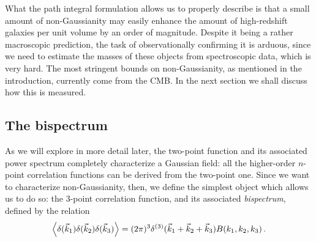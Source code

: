 \documentclass[main.tex]{subfiles}
\begin{document}
What the path integral formulation allows us to properly describe is that a small amount of non-Gaussianity may easily enhance the amount of high-redshift galaxies per unit volume by an order of magnitude.
Despite it being a rather macroscopic prediction, the task of observationally confirming it is arduous, since we need to estimate the masses of these objects from spectroscopic data, which is very hard. 
The most stringent bounds on non-Gaussianity, as mentioned in the introduction, currently come from the CMB. In the next section we shall discuss how this is measured. 





\subsection{The bispectrum}

As we will explore in more detail later, the two-point function and its associated power spectrum completely characterize a Gaussian field: all the higher-order \(n\)-point correlation functions can be derived from the two-point one.
Since we want to characterize non-Gaussianity, then, we define the simplest object which allows us to do so: the 3-point correlation function, and its associated \emph{bispectrum}, defined by the relation 
%
\begin{align}
\expval{ \delta (\vec{k}_1 ) \delta (\vec{k}_2 ) \delta (\vec{k}_3 ) }
= (2 \pi )^3 \delta^{(3)} (\vec{k}_1 + \vec{k}_2 + \vec{k}_3 ) B (k_1, k_2, k_3)
\,.
\end{align}
\end{document}

